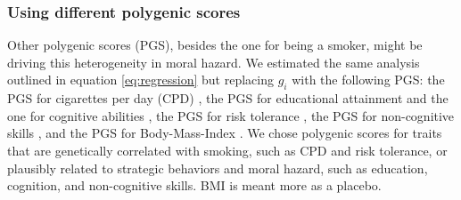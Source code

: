 \subsubsection{Using different polygenic scores} \label{appsec:otherPGS}
Other polygenic scores (PGS), besides the one for being a smoker, might be driving this heterogeneity in moral hazard.
We estimated the same analysis outlined in equation \ref{eq:regression} but replacing $g_i$ with the following PGS:
the PGS for cigarettes per day (CPD) \citep{GSCAN2019gwas}, the PGS for educational attainment and the one for cognitive abilities \citep{Lee2018}, the PGS for risk tolerance \citep{KarlssonLinner2019}, the PGS for non-cognitive skills \citep{Demange2020}, and the PGS for Body-Mass-Index \citep{Yengo2018}.
We chose polygenic scores for traits that are genetically correlated with smoking, such as CPD and risk tolerance, or plausibly related to strategic behaviors and moral hazard, such as education, cognition, and non-cognitive skills. BMI is meant more as a placebo.


